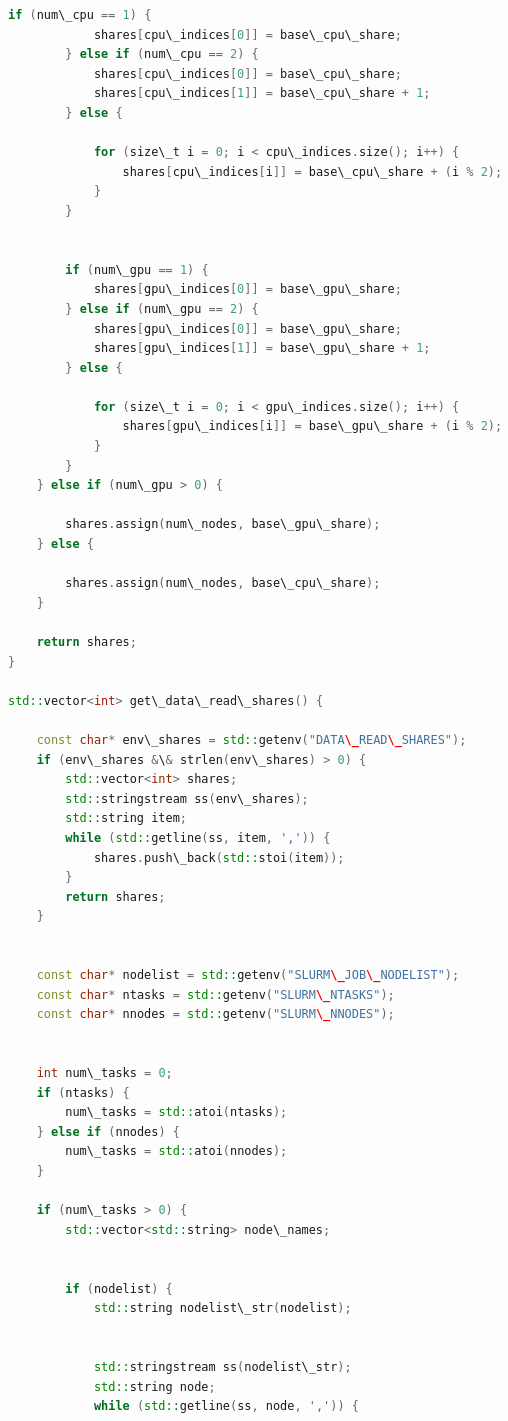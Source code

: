 \documentclass[areaset=advanced]{scrartcl}
\begin{document}
\begin{lstlisting}[language=C++]
        if (num\_cpu == 1) {
            shares[cpu\_indices[0]] = base\_cpu\_share;
        } else if (num\_cpu == 2) {
            shares[cpu\_indices[0]] = base\_cpu\_share;
            shares[cpu\_indices[1]] = base\_cpu\_share + 1;
        } else {

            for (size\_t i = 0; i < cpu\_indices.size(); i++) {
                shares[cpu\_indices[i]] = base\_cpu\_share + (i % 2);
            }
        }
        

        if (num\_gpu == 1) {
            shares[gpu\_indices[0]] = base\_gpu\_share;
        } else if (num\_gpu == 2) {
            shares[gpu\_indices[0]] = base\_gpu\_share;
            shares[gpu\_indices[1]] = base\_gpu\_share + 1;
        } else {

            for (size\_t i = 0; i < gpu\_indices.size(); i++) {
                shares[gpu\_indices[i]] = base\_gpu\_share + (i % 2);
            }
        }
    } else if (num\_gpu > 0) {

        shares.assign(num\_nodes, base\_gpu\_share);
    } else {

        shares.assign(num\_nodes, base\_cpu\_share);
    }
    
    return shares;
}

std::vector<int> get\_data\_read\_shares() {

    const char* env\_shares = std::getenv("DATA\_READ\_SHARES");
    if (env\_shares &\& strlen(env\_shares) > 0) {
        std::vector<int> shares;
        std::stringstream ss(env\_shares);
        std::string item;
        while (std::getline(ss, item, ',')) {
            shares.push\_back(std::stoi(item));
        }
        return shares;
    }
    

    const char* nodelist = std::getenv("SLURM\_JOB\_NODELIST");
    const char* ntasks = std::getenv("SLURM\_NTASKS");
    const char* nnodes = std::getenv("SLURM\_NNODES");
    

    int num\_tasks = 0;
    if (ntasks) {
        num\_tasks = std::atoi(ntasks);
    } else if (nnodes) {
        num\_tasks = std::atoi(nnodes);
    }
    
    if (num\_tasks > 0) {
        std::vector<std::string> node\_names;
        

        if (nodelist) {
            std::string nodelist\_str(nodelist);
            

            std::stringstream ss(nodelist\_str);
            std::string node;
            while (std::getline(ss, node, ',')) {


\end{lstlisting}
\end{document}
